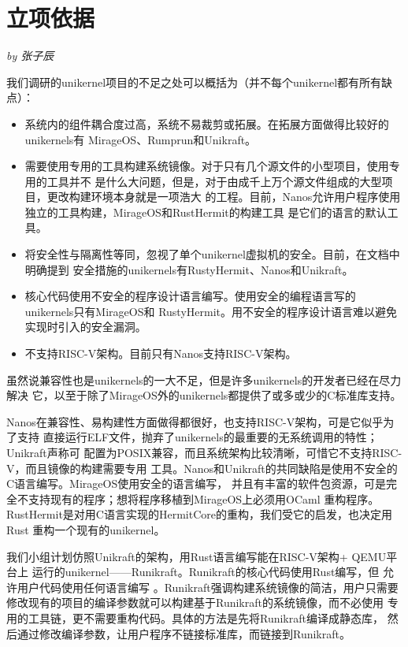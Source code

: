 \documentclass[UTF8,fontset=none,linespread=1.15]{ctexart}
\newcommand{\sectionauthor}[1]{%
\vspace*{-5ex}
\noindent\textrm{\hfill\textit{by #1}}
\vspace*{2ex}\par}
\begin{document}

\section{立项依据}\sectionauthor{张子辰}
我们调研的unikernel项目的不足之处可以概括为（并不每个unikernel都有所有缺点）：
\begin{itemize}
\item 系统内的组件耦合度过高，系统不易裁剪或拓展。在拓展方面做得比较好的unikernels有
MirageOS、Rumprun和Unikraft。
\item 需要使用专用的工具构建系统镜像。对于只有几个源文件的小型项目，使用专用的工具并不
是什么大问题，但是，对于由成千上万个源文件组成的大型项目，更改构建环境本身就是一项浩大
的工程。目前，Nanos允许用户程序使用独立的工具构建，MirageOS和RustHermit的构建工具
是它们的语言的默认工具。
\item 将安全性与隔离性等同，忽视了单个unikernel虚拟机的安全。目前，在文档中明确提到
安全措施的unikernels有RustyHermit、Nanos和Unikraft。
\item 核心代码使用不安全的程序设计语言编写。使用安全的编程语言写的unikernels只有MirageOS和
RustyHermit。用不安全的程序设计语言难以避免实现时引入的安全漏洞。
\item 不支持RISC-V架构。目前只有Nanos支持RISC-V架构。
\end{itemize}
虽然说兼容性也是unikernels的一大不足，但是许多unikernels的开发者已经在尽力解决
它，以至于除了MirageOS外的unikernels都提供了或多或少的C标准库支持。

Nanos在兼容性、易构建性方面做得都很好，也支持RISC-V架构，可是它似乎为了支持
直接运行ELF文件，抛弃了unikernels的最重要的无系统调用的特性；Unikraft声称可
配置为POSIX兼容，而且系统架构比较清晰，可惜它不支持RISC-V，而且镜像的构建需要专用
工具。Nanos和Unikraft的共同缺陷是使用不安全的C语言编写。MirageOS使用安全的语言编写，
并且有丰富的软件包资源，可是完全不支持现有的程序；想将程序移植到MirageOS上必须用OCaml
重构程序。RustHermit是对用C语言实现的HermitCore的重构，我们受它的启发，也决定用Rust
重构一个现有的unikernel。

我们小组计划仿照Unikraft的架构，用Rust语言编写能在RISC-V架构+ QEMU平台上
运行的unikernel——Runikraft。Runikraft的核心代码使用Rust编写，但
允许用户代码使用任何语言编写
。Runikraft强调构建系统镜像的简洁，用户只需要
修改现有的项目的编译参数就可以构建基于Runikraft的系统镜像，而不必使用
专用的工具链，更不需要重构代码。具体的方法是先将Runikraft编译成静态库，
然后通过修改编译参数，让用户程序不链接标准库，而链接到Runikraft。
\end{document}
